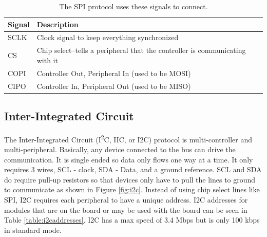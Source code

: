 \begin{table}[!ht]
	\centering
	\begin{tabular}{l l}
		\hline
		Signal & Description \\ 
		\hline
		SCLK & Clock signal to keep everything synchronized \\
		CS & Chip select--tells a peripheral that the controller is communicating with it \\
		COPI & Controller Out, Peripheral In (used to be MOSI) \\
		CIPO & Controller In, Peripheral Out (used to be MISO) \\
		\hline
	\end{tabular}
	\caption{The SPI protocol uses these signals to connect.}
	\label{table:spiwires}
\end{table}

\subsection{Inter-Integrated Circuit}
The Inter-Integrated Circuit (I\textsuperscript{2}C, IIC, or I2C) protocol is multi-controller and multi-peripheral. Basically,
any device connected to the bus can drive the communication. It is single ended so data only flows one way at a time. It only 
requires 3 wires, SCL - clock, SDA - Data, and a ground reference. SCL and SDA do require pull-up resistors so that devices
only have to pull the lines to ground to communicate as shown in Figure \ref{fig:i2c}. Instead of using chip select lines 
like SPI, I2C requires each peripheral to have a unique address. I2C addresses for modules that are on the board or may be 
used with the board can be seen in Table \ref{table:i2caddresses}. I2C has a max speed of 3.4 Mbps but is only 100 kbps in 
standard mode.

